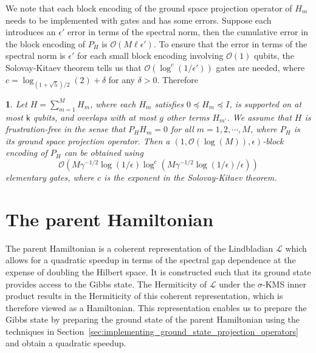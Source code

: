 \documentclass{article}
\theoremstyle{plain}
\theoremstyle{plain}
\theoremstyle{plain}
\theoremstyle{plain}
\theoremstyle{plain}
\theoremstyle{plain}
\newtheorem{cor}{\protect\corollaryname}
\theoremstyle{plain}
\providecommand{\corollaryname}{Corollary}
\newcommand{\Or}{\mathcal{O}}
\begin{document}
We note that each block encoding of the ground space projection operator of $H_m$ needs to be implemented with gates and has some errors. Suppose each introduces an $\epsilon'$ error in terms of the spectral norm, then the cumulative error in the block encoding of $P_H$ is $\Or(M\ell \epsilon')$. To ensure that the error in terms of the spectral norm is $\epsilon'$ for each small block encoding involving $\Or(1)$ qubits, the Solovay-Kitaev theorem tells us that $\Or(\log^c(1/\epsilon'))$ gates are needed, where $c=\log_{(1+\sqrt{5})/2}(2)+\delta$ for any $\delta>0$. Therefore
\begin{cor}
    \label{cor:gate_complexity_approximate_proj}
    Let $H = \sum_{m=1}^M H_m$, where each $H_m$ satisfies $0\preceq H_m\preceq I$, is supported on at most $\mathsf{k}$ qubits, and overlaps with at most $g$ other terms $H_{m'}$. We assume that $H$ is frustration-free in the sense that $P_H H_m=0$ for all $m=1,2,\cdots,M$, where $P_H$ is its ground space projection operator. Then a $(1,\Or(\log(M)),\epsilon)$-block encoding of $P_H$ can be obtained using 
    \[
    \Or\left(M\gamma^{-1/2}\log(1/\epsilon)\log^c(M\gamma^{-1/2}\log(1/\epsilon)/\epsilon)\right)
    \]
    elementary gates, where $c$ is the exponent in the Solovay-Kitaev theorem.
\end{cor}

\section{The parent Hamiltonian}
\label{sec:parent_hamiltonian}

The parent Hamiltonian is a coherent representation of the Lindbladian $\mathcal{L}$ which allows for a quadratic speedup in terms of the spectral gap dependence at the expense of doubling the Hilbert space. It is constructed such that its ground state provides access to the Gibbs state. The Hermiticity of $\mathcal{L}$ under the $\sigma$-KMS inner product results in the Hermiticity of this coherent representation, which is therefore viewed as a Hamiltonian. This representation enables us to prepare the Gibbs state by preparing the ground state of the parent Hamiltonian using the techniques in Section~\ref{sec:implementing_ground_state_projection_operators} and obtain a quadratic speedup.
\end{document}
